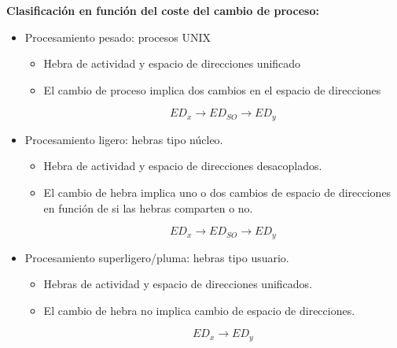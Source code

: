 \documentclass{article}
\begin{document}
\textbf{Clasificación en función del coste del cambio de proceso:}
\begin{itemize}
\item Procesamiento pesado: procesos UNIX
	\begin{itemize}
	\item Hebra de actividad y espacio de direcciones unificado
	
	\item El cambio de proceso implica dos cambios en el espacio de direcciones
	
	\begin{equation*}
	ED_x\rightarrow ED_{SO}\rightarrow ED_y
	\end{equation*}
	\end{itemize}

\item Procesamiento ligero: hebras tipo núcleo.
	\begin{itemize}
	\item Hebra de actividad y espacio de direcciones desacoplados.
	
	\item El cambio de hebra implica uno o dos cambios de espacio de direcciones en función de si las hebras comparten o no.
	
	\begin{equation*}
	ED_x\rightarrow ED_{SO}\rightarrow ED_y
	\end{equation*}
	\end{itemize}
	
\item Procesamiento superligero/pluma: hebras tipo usuario.
	\begin{itemize}
	\item Hebras de actividad y espacio de direcciones unificados.
	
	\item El cambio de hebra no implica cambio de espacio de direcciones.
	
	\begin{equation*}
	ED_x\rightarrow ED_y
	\end{equation*}
	\end{itemize}
\end{itemize}
\end{document}

